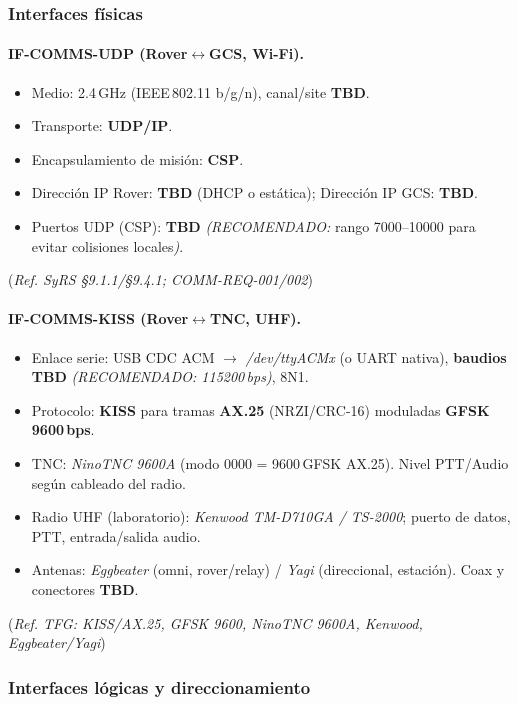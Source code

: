 \subsubsection{Interfaces físicas}
\paragraph{IF-COMMS-UDP (Rover$\leftrightarrow$GCS, Wi-Fi).}
\begin{itemize}
  \item Medio: 2.4\,GHz (IEEE\,802.11 b/g/n), canal/site \textbf{TBD}.
  \item Transporte: \textbf{UDP/IP}.
  \item Encapsulamiento de misión: \textbf{CSP}.
  \item Dirección IP Rover: \textbf{TBD} (DHCP o estática); Dirección IP GCS: \textbf{TBD}.
  \item Puertos UDP (CSP): \textbf{TBD} \emph{(RECOMENDADO:} rango 7000–10000 para evitar colisiones locales\emph{)}.
\end{itemize}
(\emph{Ref. SyRS §9.1.1/§9.4.1; COMM-REQ-001/002})%

\paragraph{IF-COMMS-KISS (Rover$\leftrightarrow$TNC, UHF).}
\begin{itemize}
  \item Enlace serie: USB CDC ACM $\rightarrow$ \emph{/dev/ttyACMx} (o UART nativa), \textbf{baudios TBD}
        \emph{(RECOMENDADO: 115200\,bps)}, 8N1.
  \item Protocolo: \textbf{KISS} para tramas \textbf{AX.25} (NRZI/CRC-16) moduladas \textbf{GFSK 9600\,bps}.
  \item TNC: \emph{NinoTNC 9600A} (modo 0000 = 9600\,GFSK AX.25). Nivel PTT/Audio según cableado del radio.
  \item Radio UHF (laboratorio): \emph{Kenwood TM-D710GA / TS-2000}; puerto de datos, PTT, entrada/salida audio.
  \item Antenas: \emph{Eggbeater} (omni, rover/relay) / \emph{Yagi} (direccional, estación). Coax y conectores \textbf{TBD}.
\end{itemize}
(\emph{Ref. TFG: KISS/AX.25, GFSK 9600, NinoTNC 9600A, Kenwood, Eggbeater/Yagi})%

\subsubsection{Interfaces lógicas y direccionamiento}
